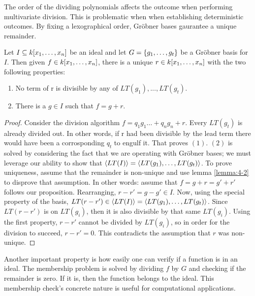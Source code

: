 The order of the dividing polynomials affects the outcome when performing multivariate division. This is problematic when when establishing deterministic outcomes. By fixing a lexographical order, Gröbner bases gaurantee a unique remainder. 

\begin{proposition}
    Let $I \subseteq k\lbrack x_1, \dots, x_n \rbrack$ be an ideal and let $G =  \lbrace g_1, \dots, g_t \rbrace$ be a Gröbner basis for $I$. Then given $ f \in k\lbrack x_1, \dots, x_n \rbrack$, there is a unique $r \in  k\lbrack x_1, \dots, x_n \rbrack$ with the two following properties:
    
    \begin{enumerate}
        \item No term of r is divisible by any of $LT(g_1), ... , LT(g_t)$.
        \item There is a $g \in I$ such that $f = g + r$.
    \end{enumerate}

    \begin{proof}
        Consider the division algorithm $f = q_1 g_1 \dots + q_n g_n + r $. Every $LT(g_t)$ is already divided out. In other words, if r had been divisible by the lead term there would have been a corrosponding $q_t$ to engulf it. That proves $(1)$. $(2)$ is solved by considering the fact that we are operating with Gröbner bases; we must leverage our ability to show that $\langle LT(I) \rangle = \langle LT(g_1), \dots, LT(g_t) \rangle$. To prove uniqueness, assume that the remainder is non-unique and use lemma \ref{lemma:4-2} to disprove that assumption. In other words: assume that $f = g + r = g' + r'$ follows our proposition. Rearranging, $r-r'= g-g'\in I$. Now, using the special property of the basis, $LT(r-r') \in \langle LT(I) \rangle = \langle LT(g_1), \dots, LT(g_t) \rangle$. Since $LT(r-r')$ is on $LT(g_i)$, then it is also divisible by that same $LT(g_i)$. Using the first property, $r - r'$ cannot be divided by $LT(g_i)$, so in order for the division to succeed, $r - r' = 0$. This contradicts the assumption that $r$ was non-unique.   
    \end{proof}
\end{proposition}

Another important property is how easily one can verify if a function is in an ideal. The membership problem is solved by dividing $f$ by $G$ and checking if the remainder is zero. If it is, then the function belongs to the ideal. This membership check's concrete nature is useful for computational applications. 